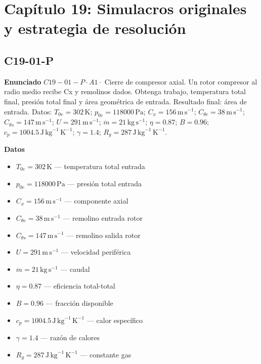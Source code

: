 \documentclass[10pt,openany]{book}
\begin{document}
\section{Capítulo 19: Simulacros originales y estrategia de resolución}
\subsection*{C19-01-P}

\noindent\textbf{Enunciado}
\(C19-01-P \cdot A1 \cdot\) Cierre de compresor axial. Un rotor compresor al radio medio recibe Cx y remolinos dados. Obtenga trabajo, temperatura total final, presión total final y área geométrica de entrada. Resultado final: área de entrada. Datos: \(T_{0e}=302\, \mathrm{K}\); \(p_{0e}=118000\, \mathrm{Pa}\); \(C_x=156\, \mathrm{m}\,\mathrm{s}^{-1}\); \(C_{\theta e}=38\, \mathrm{m}\,\mathrm{s}^{-1}\); \(C_{\theta s}=147\, \mathrm{m}\,\mathrm{s}^{-1}\); \(U=291\, \mathrm{m}\,\mathrm{s}^{-1}\); \(\dot m=21\, \mathrm{kg}\,\mathrm{s}^{-1}\); \(\eta=0.87\); \(B=0.96\); \(c_p=1004.5\, \mathrm{J}\,\mathrm{kg}^{-1}\,\mathrm{K}^{-1}\); \(\gamma=1.4\); \(R_g=287\, \mathrm{J}\,\mathrm{kg}^{-1}\,\mathrm{K}^{-1}\).

\noindent\textbf{Datos}
\begin{itemize}
\item $T_{0e} = 302\,\mathrm{K}$ — temperatura total entrada
\item $p_{0e} = 118000\,\mathrm{Pa}$ — presión total entrada
\item $C_x = 156\,\mathrm{m}\,\mathrm{s}^{-1}$ — componente axial
\item $C_{\theta e} = 38\,\mathrm{m}\,\mathrm{s}^{-1}$ — remolino entrada rotor
\item $C_{\theta s} = 147\,\mathrm{m}\,\mathrm{s}^{-1}$ — remolino salida rotor
\item $U = 291\,\mathrm{m}\,\mathrm{s}^{-1}$ — velocidad periférica
\item $\dot m = 21\,\mathrm{kg}\,\mathrm{s}^{-1}$ — caudal
\item $\eta = 0.87$ — eficiencia total-total
\item $B = 0.96$ — fracción disponible
\item $c_p = 1004.5\,\mathrm{J}\,\mathrm{kg}^{-1}\,\mathrm{K}^{-1}$ — calor específico
\item $\gamma = 1.4$ — razón de calores
\item $R_g = 287\,\mathrm{J}\,\mathrm{kg}^{-1}\,\mathrm{K}^{-1}$ — constante gas
\end{itemize}
\end{document}
